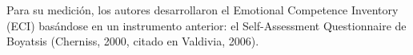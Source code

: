 Para su medición, los autores desarrollaron el Emotional Competence Inventory (ECI) basándose en un instrumento anterior: el Self-Assessment Questionnaire de Boyatsis (Cherniss, 2000, citado en Valdivia, 2006).
\\\\




